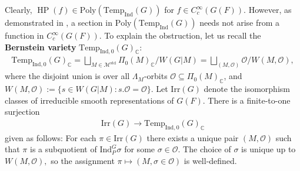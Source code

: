 \documentclass[10pt]{amsart}
\theoremstyle{definition}
\numberwithin{equation}{section}
\numberwithin{equation}{subsection}
\newcommand{\Ind}{\mathrm{Ind}}
\newcommand{\CC}{\mathbb{C}}
\newcommand{\calO}{\mathcal{O}}
\newcommand{\Temp}{\mathrm{Temp}}
\newcommand{\HP}{\mathop{\mathrm{HP}}\nolimits}
\begin{document}
Clearly, $\HP(f)\in \mathrm{Poly}(\Temp_{\Ind}(G))$ for $f\in C^\infty_c(G(F)).$ However, as demonstrated in \cite[Example 6.2]{DRS}, a section in $\mathrm{Poly}(\Temp_{\Ind}(G))$ needs not arise from a function in $C_c^\infty(G(F)).$ To explain the obstruction, let us recall the \textbf{Bernstein variety}  $\Temp_{\Ind,0}(G)_\CC:$
\begin{align*}
    \Temp_{\Ind,0}(G)_\CC = \bigsqcup\limits_{M\in\mathcal{M}^{\mathrm{std}}} \Pi_0(M)_\CC / W(G|M) = \bigsqcup\limits_{(M,\mathcal{O})} \mathcal{O}/ W(M,\mathcal{O}),
\end{align*}
where the disjoint union is over all $\Lambda_M$-orbits $\mathcal{O}\subseteq \Pi_0(M)_\CC$, and $W(M,\mathcal{O}):= \{s\in W(G|M): s.\mathcal{O}=\mathcal{O}\}$. Let $\mathrm{Irr}(G)$ denote the isomorphism classes of irreducible smooth representations of $G(F)$. There is a finite-to-one surjection
\begin{align*}
    \mathrm{Irr}(G)\longrightarrow \Temp_{\Ind,0}(G)_\CC
\end{align*}
given as follows: For each $\pi\in\mathrm{Irr}(G)$ there exists a unique pair $(M,\mathcal{O})$ such that $\pi$ is a subquotient of $\Ind_P^G\sigma$ for some $\sigma\in \mathcal{O}$. The choice of $\sigma$ is unique up to $W(M,\calO),$ so the assignment $\pi\mapsto (M,\sigma\in \mathcal{O})$ is well-defined.

\end{document}
